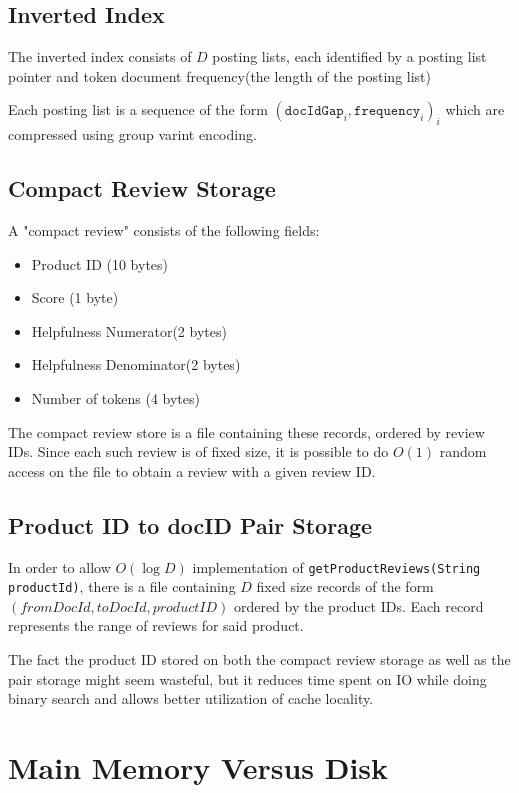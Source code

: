 \documentclass[11pt]{article}
\begin{document}
\subsection{Inverted Index}

The inverted index consists of $D$ posting lists, each identified by a posting list pointer
and token document frequency(the length of the posting list)

Each posting list is a sequence of the form $(\texttt{docIdGap}_i, \texttt{frequency}_i)_i$ which are compressed using group varint encoding.


\subsection{Compact Review Storage}
\label{sec:compactStorage}

A "compact review" consists of the following fields:

\begin{itemize}
	\item Product ID (10 bytes)
	\item Score (1 byte)
	\item Helpfulness Numerator(2 bytes)
	\item Helpfulness Denominator(2 bytes)
	\item Number of tokens (4 bytes)
\end{itemize}

The compact review store is a file containing these records, ordered by review IDs. Since
each such review is of fixed size, it is possible to do $O(1)$ random access on the file
to obtain a review with a given review ID. 

\subsection{Product ID to docID Pair Storage}
\label{sec:pairStorage}

In order to allow $O(\log D)$ implementation of \verb+getProductReviews(String productId)+, 
there is a file containing $D$ fixed size records of the form $(fromDocId, toDocId, productID)$ ordered
by the product IDs. Each record represents the range of reviews
for said product.

The fact the product ID stored on both the compact review storage as well as the pair storage might seem wasteful, but it reduces time spent on IO
while doing binary search and allows better utilization of cache locality.


\section{Main Memory Versus Disk}
\end{document}

